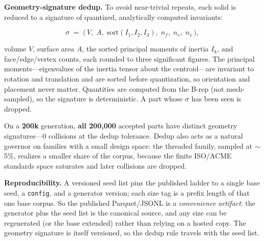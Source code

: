 \documentclass[11pt]{article}
\newcommand{\code}[1]{\texttt{#1}}
\newcommand{\fm}[1]{\textsf{\small #1}}
\begin{document}
\textbf{Geometry-signature dedup.} To avoid near-trivial repeats, each solid is
reduced to a signature of quantized, analytically computed invariants:

\vspace{-2pt}
\[
\sigma \;=\; \big(\,V,\; A,\; \mathrm{sort}(I_1,I_2,I_3),\; n_f,\; n_e,\; n_v\,\big),
\]

\vspace{-2pt}
\noindent volume $V$, surface area $A$, the sorted principal moments of inertia
$I_k$, and face/edge/vertex counts, each rounded to three significant figures.
The principal moments---eigenvalues of the inertia tensor about the centroid---are
invariant to rotation and translation and are sorted before quantization, so
orientation and placement never matter. Quantities are computed from the B-rep
(not mesh-sampled), so the signature is deterministic. A part whose $\sigma$ has
been seen is dropped.

\begin{keybox}
On a \textbf{200k} generation, \textbf{all 200{,}000} accepted parts have
distinct geometry signatures---0 collisions at the dedup tolerance. Dedup also
acts as a natural governor on families with a small design space: the
\fm{threaded} family, sampled at $\sim$5\%, realizes a smaller share of the
corpus, because the finite ISO/ACME standards space saturates and later
collisions are dropped.
\end{keybox}

\textbf{Reproducibility.} A versioned seed list pins the published ladder to a
single base seed, a \code{config}, and a generator version; each size tag is a
prefix length of that one base corpus. So the published Parquet/JSONL is a
\emph{convenience artifact}: the generator plus the seed list is the canonical
source, and any size can be regenerated (or the base extended) rather than
relying on a hosted copy. The geometry signature is itself versioned, so the
dedup rule travels with the seed list.
\end{document}

